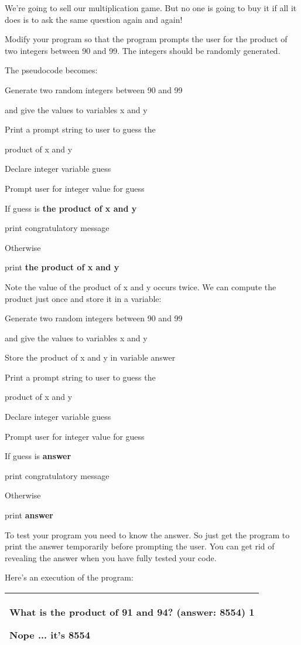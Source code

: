 \documentclass[
]{article}
\begin{document}
We're going to sell our multiplication game. But no one is going to buy
it if all it does is to ask the same question again and again!

Modify your program so that the program prompts the user for the product
of two integers between 90 and 99. The integers should be randomly
generated.

The pseudocode becomes:

Generate two random integers between 90 and 99

and give the values to variables x and y

Print a prompt string to user to guess the

product of x and y

Declare integer variable guess

Prompt user for integer value for guess

If guess is \textbf{the product of x and y}

print congratulatory message

Otherwise

print \textbf{the product of x and y}

Note the value of the product of x and y occurs twice. We can compute
the product just once and store it in a variable:

Generate two random integers between 90 and 99

and give the values to variables x and y

Store the product of x and y in variable answer

Print a prompt string to user to guess the

product of x and y

Declare integer variable guess

Prompt user for integer value for guess

If guess is \textbf{answer}

print congratulatory message

Otherwise

print \textbf{answer}

To test your program you need to know the answer. So just get the
program to print the answer temporarily before prompting the user. You
can get rid of revealing the answer when you have fully tested your
code.

Here's an execution of the program:

\begin{longtable}[]{@{}l@{}}
\toprule
\endhead
\begin{minipage}[t]{0.97\columnwidth}\raggedright
What is the product of 91 and 94? (answer: 8554) \textbf{1}

Nope ... it's 8554\strut
\end{minipage}\tabularnewline
\bottomrule
\end{longtable}
\end{document}
